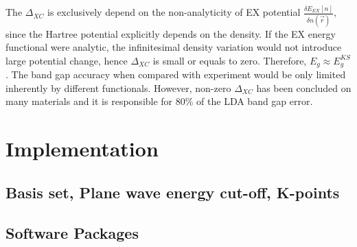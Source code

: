 The $\Delta_{XC}$ is exclusively depend on the non-analyticity of EX potential $\frac{\delta E_{EX}[n]}{\delta n(\vec{r})}$, since the Hartree potential explicitly depends on the density. If the EX energy functional were analytic, the infinitesimal density variation would not introduce large potential change, hence $\Delta_{XC}$ is small or equals to zero. Therefore, $E_g \approx E^{KS}_g$. The band gap accuracy when compared with experiment would be only limited inherently by different functionals. However, non-zero $\Delta_{XC}$ has been concluded on many materials and it is responsible for 80\% of the LDA band gap error\cite{Godby1988}. 

\section{Implementation}
\subsection{Basis set, Plane wave energy cut-off, K-points}
\subsection{Software Packages}